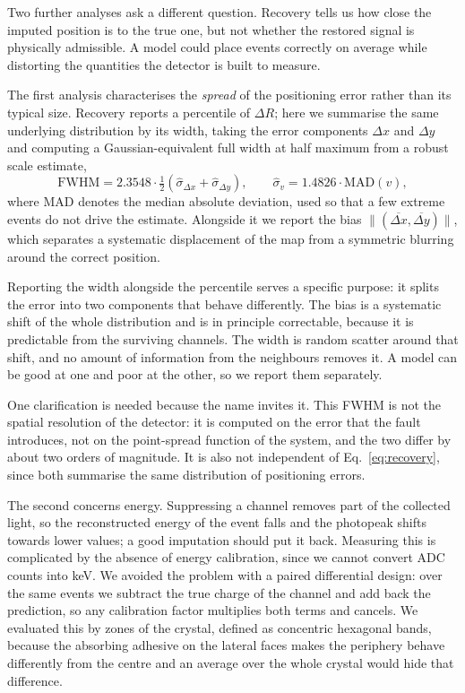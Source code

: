 \documentclass[10pt,conference]{IEEEtran}
\begin{document}
Two further analyses ask a different question. Recovery tells us how close the
imputed position is to the true one, but not whether the restored signal is
physically admissible. A model could place events correctly on average while
distorting the quantities the detector is built to measure.

The first analysis characterises the \emph{spread} of the positioning error
rather than its typical size. Recovery reports a percentile of $\Delta R$; here
we summarise the same underlying distribution by its width, taking the error
components $\Delta x$ and $\Delta y$ and computing a Gaussian-equivalent full
width at half maximum from a robust scale estimate,
%
\begin{equation}
\mathrm{FWHM} = 2.3548 \cdot \tfrac{1}{2}
  \left( \hat{\sigma}_{\Delta x} + \hat{\sigma}_{\Delta y} \right),
\qquad
\hat{\sigma}_{v} = 1.4826 \cdot \mathrm{MAD}(v),
\label{eq:fwhm}
\end{equation}
%
where MAD denotes the median absolute deviation, used so that a few extreme
events do not drive the estimate. Alongside it we report the bias
$\lVert(\overline{\Delta x}, \overline{\Delta y})\rVert$, which separates a
systematic displacement of the map from a symmetric blurring around the correct
position.

Reporting the width alongside the percentile serves a specific purpose: it
splits the error into two components that behave differently. The bias is a
systematic shift of the whole distribution and is in principle correctable,
because it is predictable from the surviving channels. The width is random
scatter around that shift, and no amount of information from the neighbours
removes it. A model can be good at one and poor at the other, so we report them
separately.

One clarification is needed because the name invites it. This FWHM is not the
spatial resolution of the detector: it is computed on the error that the fault
introduces, not on the point-spread function of the system, and the two differ
by about two orders of magnitude. It is also not independent of
Eq.~\ref{eq:recovery}, since both summarise the same distribution of
positioning errors.

The second concerns energy. Suppressing a channel removes part of the collected
light, so the reconstructed energy of the event falls and the photopeak shifts
towards lower values; a good imputation should put it back. Measuring this is
complicated by the absence of energy calibration, since we cannot convert
ADC counts into keV. We avoided the problem with a paired differential design:
over the same events we subtract the true charge of the channel and add back
the prediction, so any calibration factor multiplies both terms and cancels.
We evaluated this by zones of the crystal, defined as concentric hexagonal
bands, because the absorbing adhesive on the lateral faces makes the periphery
behave differently from the centre \cite{conde_minimization_2014} and an
average over the whole crystal would hide that difference.
\end{document}

